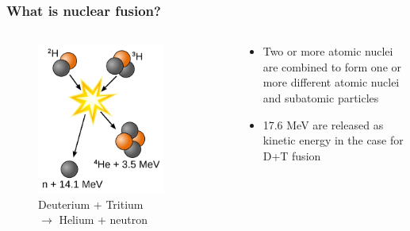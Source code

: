 \documentclass{beamer}
\begin{document}
\begin{frame}
	\frametitle{What is nuclear fusion?}
	\vspace{-1 cm}
	\begin{columns}[onlytextwidth]
		\begin{column}{0.45\textwidth}
			\begin{center}
					\begin{figure}
				\includegraphics[trim={0 0 0 2cm},clip,width=0.8\textwidth]{FIGURES/Deuterium-tritium_fusion.png}
				\caption{Deuterium + Tritium \\
					$\rightarrow$ Helium + neutron}
					\end{figure}
			\end{center}
		\end{column}
		\begin{column}{0.45\textwidth}
			\begin{center}
				\begin{itemize}
					\item Two or more atomic nuclei are combined to form one or more different atomic nuclei and subatomic particles\\
					\item 17.6 MeV are released as kinetic energy in the case for D+T fusion\\
				\end{itemize}
			\end{center}
		\end{column}
	\end{columns}
\end{frame}
\end{document}
